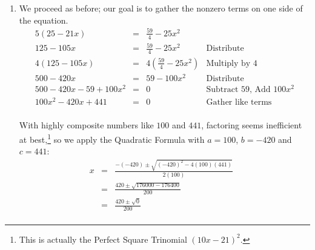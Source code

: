 \documentclass{ximera}
\begin{document}
\begin{example}
\begin{explanation}
\begin{enumerate}
\[\begin{array}{rclr}
y & = & \frac{-(-5) \pm \sqrt{(-5)^2 - 4(3)(-1)}}{2(3)} & \\  

y & = & \frac{5 \pm \sqrt{25 + 12}}{6} & \\ 

y & = & \frac{5 \pm \sqrt{37}}{6} & \\

\end{array} \] Since $37$ is prime, we have no way to reduce $\sqrt{37}$.  Thus, our final answers are $y = \frac{5 \pm \sqrt{37}}{6}$. The reader is encouraged to supply the details of the challenging verification of the answers.

\item  We proceed as before; our goal is to gather the nonzero terms on one side of the equation. \[ \begin{array}{rclr}

5(25 - 21x) & = &  \frac{59}{4} - 25x^2 & \\  

125 - 105x & = & \frac{59}{4} - 25x^2 & \text{Distribute} \\  

4(125 - 105x) & = & 4\left(\frac{59}{4} - 25x^2 \right) & \text{Multiply by $4$} \\  

500 - 420x & = & 59 - 100x^2 & \text{Distribute} \\  

500 - 420x - 59 + 100x^2 & = & 0 & \text{Subtract $59$, Add $100x^2$} \\  

100x^2 - 420x + 441 & = & 0 & \text{Gather like terms} \\  

\end{array} \]

With highly composite numbers like $100$ and $441$, factoring seems inefficient at best,\footnote{This is actually the Perfect Square Trinomial $(10x - 21)^2$.} so we apply the Quadratic Formula with $a = 100$, $b = -420$ and $c = 441$:\[ \begin{array}{rclr}

x & = & \frac{-(-420) \pm \sqrt{(-420)^2 - 4(100)(441)}}{2(100)} & \\  

 & = & \frac{420 \pm \sqrt{176000 - 176400}}{200} & \\  

& = & \frac{420 \pm \sqrt{0}}{200} & \\  


\end{array}\]
\end{enumerate}
\end{explanation}
\end{example}
\end{document}
